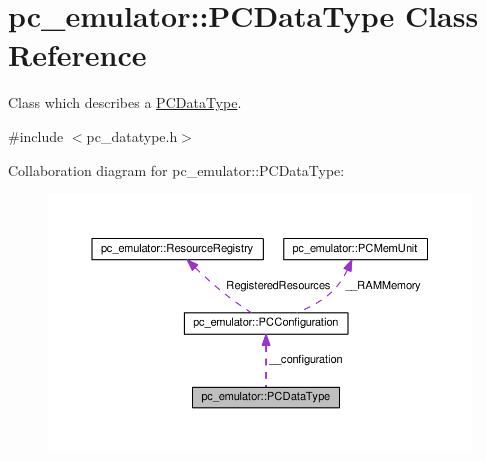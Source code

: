 \hypertarget{classpc__emulator_1_1PCDataType}{}\section{pc\+\_\+emulator\+:\+:P\+C\+Data\+Type Class Reference}
\label{classpc__emulator_1_1PCDataType}


Class which describes a \hyperlink{classpc__emulator_1_1PCDataType}{P\+C\+Data\+Type}.  




{\ttfamily \#include $<$pc\+\_\+datatype.\+h$>$}



Collaboration diagram for pc\+\_\+emulator\+:\+:P\+C\+Data\+Type\+:\nopagebreak
\begin{figure}[H]
\begin{center}
\leavevmode
\includegraphics[width=350pt]{classpc__emulator_1_1PCDataType__coll__graph}
\end{center}
\end{figure}
